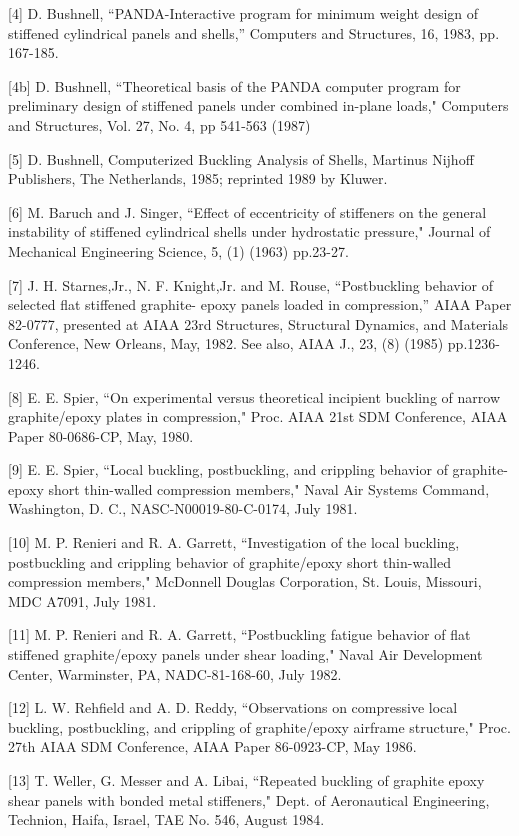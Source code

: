 [4] D. Bushnell, ``PANDA-Interactive program for minimum weight
design of stiffened cylindrical panels and shells,'' Computers and
Structures, 16, 1983, pp. 167-185.

[4b] D. Bushnell, ``Theoretical basis of the PANDA computer program
for preliminary design of stiffened panels under combined in-plane
loads," Computers and Structures, Vol. 27, No. 4, pp 541-563 (1987) 

[5] D. Bushnell,  Computerized Buckling Analysis of Shells, Martinus
Nijhoff Publishers, The Netherlands, 1985; reprinted 1989 by Kluwer.

[6] M. Baruch and J. Singer, ``Effect of eccentricity of stiffeners
on the general instability of stiffened cylindrical shells under
hydrostatic pressure," Journal of Mechanical Engineering Science, 5,
(1) (1963) pp.23-27. 

[7] J. H. Starnes,Jr., N. F. Knight,Jr. and M. Rouse, ``Postbuckling
behavior of selected flat stiffened graphite- epoxy panels loaded in
compression,'' AIAA Paper 82-0777, presented at AIAA 23rd Structures,
Structural Dynamics, and Materials Conference, New Orleans, May,
1982.  See also, AIAA J., 23, (8) (1985) pp.1236-1246. 

[8] E. E. Spier, ``On experimental versus theoretical incipient
buckling of narrow graphite/epoxy plates in compression," Proc. AIAA
21st SDM Conference, AIAA Paper 80-0686-CP, May, 1980. 

[9] E. E. Spier, ``Local buckling, postbuckling, and crippling
behavior of graphite-epoxy short thin-walled compression members,"
Naval Air Systems Command, Washington, D. C., NASC-N00019-80-C-0174,
July 1981. 

[10] M. P. Renieri and R. A. Garrett, ``Investigation of the local
buckling, postbuckling and crippling behavior of graphite/epoxy short
thin-walled compression members," McDonnell Douglas Corporation, St.
Louis, Missouri, MDC A7091, July 1981. 

[11] M. P. Renieri and R. A. Garrett, ``Postbuckling fatigue behavior
of flat stiffened graphite/epoxy panels under shear loading," Naval
Air Development Center, Warminster, PA, NADC-81-168-60, July 1982. 

[12] L. W. Rehfield and A. D. Reddy, ``Observations on compressive
local buckling, postbuckling, and crippling of graphite/epoxy
airframe structure," Proc. 27th AIAA SDM Conference, AIAA Paper
86-0923-CP, May 1986. 

[13] T. Weller, G. Messer and A. Libai, ``Repeated buckling of
graphite epoxy shear panels with bonded metal stiffeners," Dept. of
Aeronautical Engineering, Technion, Haifa, Israel, TAE No. 546,
August 1984. 

